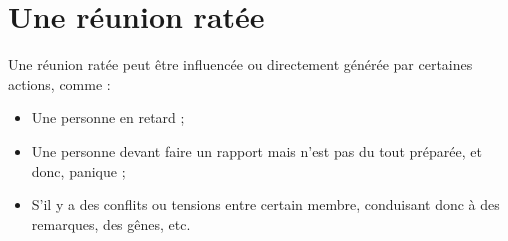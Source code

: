 \section{Une réunion ratée}
Une réunion ratée peut être influencée ou directement générée par certaines actions, comme :
\begin{itemize}
    \item Une personne en retard ;
    \item Une personne devant faire un rapport mais n'est pas du tout préparée, et donc, panique ;
    \item S'il y a des conflits ou tensions entre certain membre, conduisant donc à des remarques, des gênes, etc.
\end{itemize}

